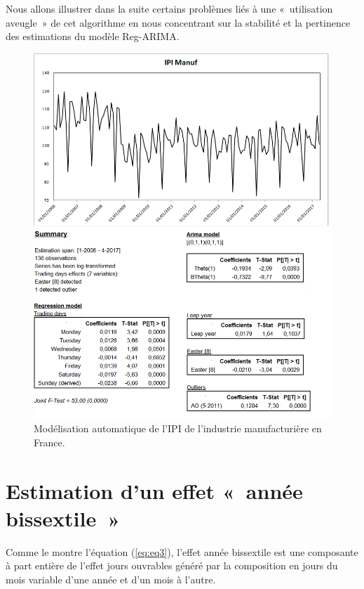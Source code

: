 \documentclass[12pt, a4paper, french]{article}
\begin{document}
Nous allons illustrer dans la suite certains problèmes liés à une «~utilisation aveugle~» de cet algorithme en nous concentrant sur la stabilité et la pertinence des estimations du modèle Reg-ARIMA.

\begin{figure}[!ht]
\begin{center}
 \includegraphics[scale=0.7]{img/IPImanuf.png}
 \caption[Modélisation automatique de l'IPI de l'industrie manufacturière en France]{Modélisation automatique de l'IPI de l'industrie manufacturière en France.}
 \label{fig:IPI}
\end{center}
\end{figure}

\clearpage

\section{Estimation d'un effet «~année bissextile~»}
\label{sec:LY}

Comme le montre l'équation (\ref{eq:eq3}), l'effet année bissextile est une composante à part entière de l'effet jours ouvrables généré par la composition en jours du mois variable d'une année et d'un mois à l'autre.
\end{document}

